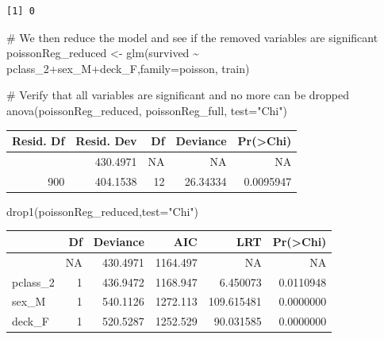 \documentclass[
  letterpaper,
  DIV=11,
  numbers=noendperiod]{scrartcl}
\newenvironment{Shaded}{\begin{snugshade}}{\end{snugshade}}
\newcommand{\AttributeTok}[1]{\textcolor[rgb]{0.40,0.45,0.13}{#1}}
\newcommand{\CommentTok}[1]{\textcolor[rgb]{0.37,0.37,0.37}{#1}}
\newcommand{\FunctionTok}[1]{\textcolor[rgb]{0.28,0.35,0.67}{#1}}
\newcommand{\NormalTok}[1]{\textcolor[rgb]{0.00,0.23,0.31}{#1}}
\newcommand{\OtherTok}[1]{\textcolor[rgb]{0.00,0.23,0.31}{#1}}
\newcommand{\SpecialCharTok}[1]{\textcolor[rgb]{0.37,0.37,0.37}{#1}}
\newcommand{\StringTok}[1]{\textcolor[rgb]{0.13,0.47,0.30}{#1}}
\begin{document}
\begin{verbatim}
[1] 0
\end{verbatim}

\begin{Shaded}
\begin{Highlighting}[]
\CommentTok{\# We then reduce the model and see if the removed variables are significant}
\NormalTok{poissonReg\_reduced }\OtherTok{\textless{}{-}} \FunctionTok{glm}\NormalTok{(survived }\SpecialCharTok{\textasciitilde{}}\NormalTok{ pclass\_2}\SpecialCharTok{+}\NormalTok{sex\_M}\SpecialCharTok{+}\NormalTok{deck\_F,}\AttributeTok{family=}\NormalTok{poisson, train)}

\CommentTok{\# Verify that all variables are significant and no more can be dropped}
\FunctionTok{anova}\NormalTok{(poissonReg\_reduced, poissonReg\_full, }\AttributeTok{test=}\StringTok{"Chi"}\NormalTok{)}
\end{Highlighting}
\end{Shaded}

\begin{longtable}[]{@{}rrrrr@{}}
\toprule\noalign{}
Resid. Df & Resid. Dev & Df & Deviance & Pr(\textgreater Chi) \\
\midrule\noalign{}
\endhead
\bottomrule\noalign{}
\endlastfoot
912 & 430.4971 & NA & NA & NA \\
900 & 404.1538 & 12 & 26.34334 & 0.0095947 \\
\end{longtable}

\begin{Shaded}
\begin{Highlighting}[]
\FunctionTok{drop1}\NormalTok{(poissonReg\_reduced,}\AttributeTok{test=}\StringTok{"Chi"}\NormalTok{)}
\end{Highlighting}
\end{Shaded}

\begin{longtable}[]{@{}lrrrrr@{}}
\toprule\noalign{}
& Df & Deviance & AIC & LRT & Pr(\textgreater Chi) \\
\midrule\noalign{}
\endhead
\bottomrule\noalign{}
\endlastfoot
& NA & 430.4971 & 1164.497 & NA & NA \\
pclass\_2 & 1 & 436.9472 & 1168.947 & 6.450073 & 0.0110948 \\
sex\_M & 1 & 540.1126 & 1272.113 & 109.615481 & 0.0000000 \\
deck\_F & 1 & 520.5287 & 1252.529 & 90.031585 & 0.0000000 \\
\end{longtable}
\end{document}
